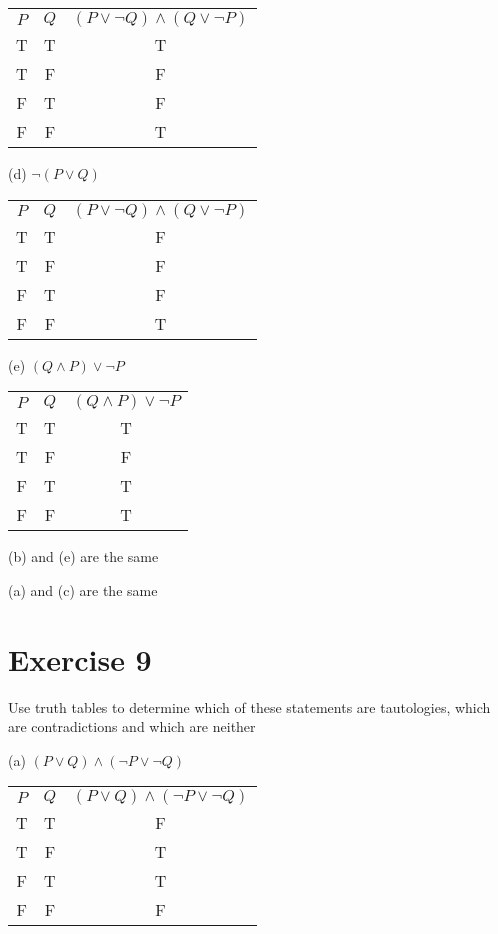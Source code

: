 \documentclass[11pt]{article}
\begin{document}
\begin{center}
\begin{tabular}{ c c c }
 $P$ & $Q$ & $(P \vee \neg Q) \wedge (Q \vee \neg P)$\\ 
T & T & T\\  
T & F & F\\
F & T & F\\  
F & F & T
\end{tabular}
\end{center}

\noindent (d) $\neg (P \vee Q)$

\begin{center}
\begin{tabular}{ c c c }
 $P$ & $Q$ & $(P \vee \neg Q) \wedge (Q \vee \neg P)$\\ 
T & T & F\\  
T & F & F\\
F & T & F\\  
F & F & T
\end{tabular}
\end{center}

\noindent (e) $(Q \wedge P) \vee \neg P$

\begin{center}
\begin{tabular}{ c c c }
 $P$ & $Q$ & $(Q \wedge P) \vee \neg P$\\ 
T & T & T\\  
T & F & F\\
F & T & T\\  
F & F & T
\end{tabular}
\end{center}

(b) and (e) are the same

(a) and (c) are the same

\section*{Exercise 9}

Use truth tables to determine which of these statements are tautologies, which are contradictions and which are neither

\noindent (a) $(P \vee Q) \wedge (\neg P \vee \neg Q)$

\begin{center}
\begin{tabular}{ c c c }
 $P$ & $Q$ & $(P \vee Q) \wedge (\neg P \vee \neg Q)$\\ 
T & T & F\\  
T & F & T\\
F & T & T\\  
F & F & F
\end{tabular}
\end{center}
\end{document}

